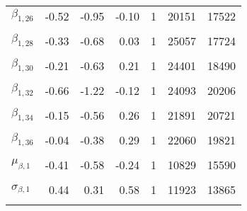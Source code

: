 \begin{table}
\begin{tabular}[t]{lrrrrrr}
$\beta_{1, 26}$ & -0.52 & -0.95 & -0.10 & 1 & 20151 & 17522\\
\cellcolor{gray!6}{$\beta_{1, 27}$} & \cellcolor{gray!6}{-0.59} & \cellcolor{gray!6}{-1.29} & \cellcolor{gray!6}{0.09} & \cellcolor{gray!6}{1} & \cellcolor{gray!6}{26813} & \cellcolor{gray!6}{19838}\\
$\beta_{1, 28}$ & -0.33 & -0.68 & 0.03 & 1 & 25057 & 17724\\
\cellcolor{gray!6}{$\beta_{1, 29}$} & \cellcolor{gray!6}{-0.35} & \cellcolor{gray!6}{-0.74} & \cellcolor{gray!6}{0.03} & \cellcolor{gray!6}{1} & \cellcolor{gray!6}{20194} & \cellcolor{gray!6}{13617}\\
$\beta_{1, 30}$ & -0.21 & -0.63 & 0.21 & 1 & 24401 & 18490\\
\cellcolor{gray!6}{$\beta_{1, 31}$} & \cellcolor{gray!6}{-0.85} & \cellcolor{gray!6}{-1.29} & \cellcolor{gray!6}{-0.41} & \cellcolor{gray!6}{1} & \cellcolor{gray!6}{15339} & \cellcolor{gray!6}{13449}\\
$\beta_{1, 32}$ & -0.66 & -1.22 & -0.12 & 1 & 24093 & 20206\\
\cellcolor{gray!6}{$\beta_{1, 33}$} & \cellcolor{gray!6}{-0.46} & \cellcolor{gray!6}{-1.19} & \cellcolor{gray!6}{0.26} & \cellcolor{gray!6}{1} & \cellcolor{gray!6}{26710} & \cellcolor{gray!6}{19395}\\
$\beta_{1, 34}$ & -0.15 & -0.56 & 0.26 & 1 & 21891 & 20721\\
\cellcolor{gray!6}{$\beta_{1, 35}$} & \cellcolor{gray!6}{0.03} & \cellcolor{gray!6}{-0.30} & \cellcolor{gray!6}{0.37} & \cellcolor{gray!6}{1} & \cellcolor{gray!6}{12197} & \cellcolor{gray!6}{15528}\\
$\beta_{1, 36}$ & -0.04 & -0.38 & 0.29 & 1 & 22060 & 19821\\
\cellcolor{gray!6}{$\mu_{\beta, 0}$} & \cellcolor{gray!6}{0.86} & \cellcolor{gray!6}{0.78} & \cellcolor{gray!6}{0.94} & \cellcolor{gray!6}{1} & \cellcolor{gray!6}{9102} & \cellcolor{gray!6}{14486}\\
$\mu_{\beta, 1}$ & -0.41 & -0.58 & -0.24 & 1 & 10829 & 15590\\
\cellcolor{gray!6}{$\sigma_{\beta, 0}$} & \cellcolor{gray!6}{0.18} & \cellcolor{gray!6}{0.11} & \cellcolor{gray!6}{0.26} & \cellcolor{gray!6}{1} & \cellcolor{gray!6}{4598} & \cellcolor{gray!6}{6017}\\
$\sigma_{\beta, 1}$ & 0.44 & 0.31 & 0.58 & 1 & 11923 & 13865\\
\cellcolor{gray!6}{$\sigma_{y}$} & \cellcolor{gray!6}{0.18} & \cellcolor{gray!6}{0.15} & \cellcolor{gray!6}{0.21} & \cellcolor{gray!6}{1} & \cellcolor{gray!6}{12477} & \cellcolor{gray!6}{16880}\\
\bottomrule
\end{tabular}
\end{table}